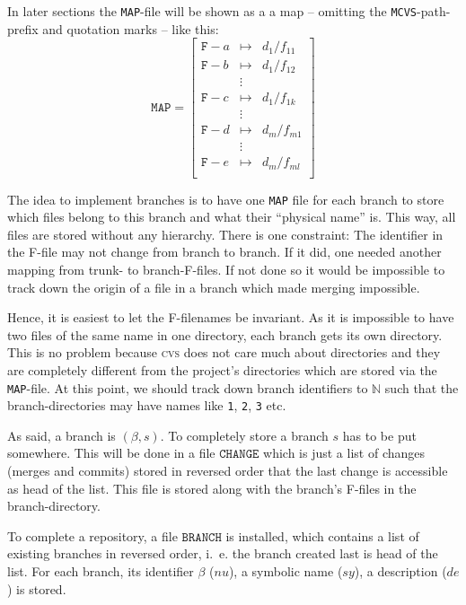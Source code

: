 \documentclass[fleqn, 10pt, a4paper]{report} \usepackage{amssymb}
\begin{document}
In later sections the \texttt{MAP}-file will be shown as a a map --
omitting the \texttt{MCVS}-path-prefix and quotation marks -- like
this:
\begin{displaymath}
  \mathtt{MAP} =\left[
    \begin{array}{lcl}
      \mathtt{F-}a &\mapsto& d_1/f_{11} \\
      \mathtt{F-}b &\mapsto& d_1/f_{12} \\
      &\vdots & \\
      \mathtt{F-}c &\mapsto& d_1/f_{1k} \\
      &\vdots & \\
      \mathtt{F-}d &\mapsto& d_m/f_{m1} \\
      &\vdots & \\
      \mathtt{F-}e &\mapsto& d_m/f_{ml} \\
    \end{array}\right]
\end{displaymath}

The idea to implement branches is to have one \texttt{MAP} file for
each branch to store which files belong to this branch and what their
``physical name'' is. This way, all files are stored without any
hierarchy. There is one constraint: The identifier in the F-file may
not change from branch to branch. If it did, one needed another
mapping from trunk- to branch-F-files. If not done so it would be
impossible to track down the origin of a file in a branch which made
merging impossible.

Hence, it is easiest to let the F-filenames be invariant. As it is
impossible to have two files of the same name in one directory, each
branch gets its own directory. This is no problem because \textsc{cvs}
does not care much about directories and they are completely different
from the project's directories which are stored via the
\texttt{MAP}-file.  At this point, we should track down branch
identifiers to $\mathbb{N}$ such that the branch-directories may have
names like \texttt{1}, \texttt{2}, \texttt{3} etc.

As said, a branch is $(\beta, s)$. To completely store a branch $s$
has to be put somewhere. This will be done in a file $\mathtt{CHANGE}$
which is just a list of changes (merges and commits) stored in
reversed order that the last change is accessible as head of the list.
This file is stored along with the branch's F-files in the
branch-directory.

To complete a repository, a file $\mathtt{BRANCH}$ is installed, which
contains a list of existing branches in reversed order, i.~e. the
branch created last is head of the list. For each branch, its
identifier $\beta$ ($nu$), a symbolic name ($sy$), a description
($de$) is stored.
\end{document}

